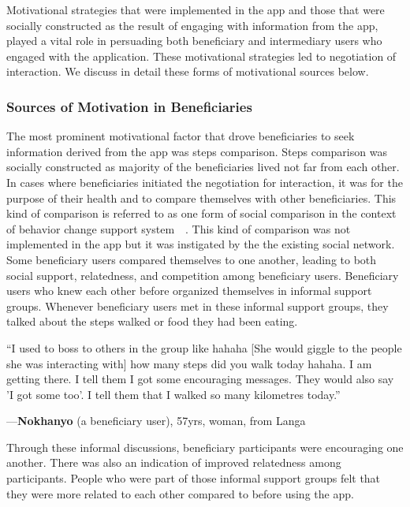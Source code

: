\documentclass{sig-alternate}
\newenvironment{myquote}
               {\list{}{\rightmargin   \leftmargin
                        \parsep        0in }%
                \item\relax}
               {\endlist}
\newcommand{\userquote}[2]{\begin{samepage}\begin{myquote} 
     \em{\small{#2\begin{flushright}---#1\end{flushright}}}
   \end{myquote}\end{samepage}}
\begin{document}
Motivational strategies that were implemented in the app and those that were
socially constructed as the result of engaging with information from the app,
played a vital role in persuading both beneficiary and intermediary users who
engaged with the application. These motivational strategies led to negotiation
of interaction. We discuss in detail these forms of motivational sources
below.

\subsubsection*{\textbf{Sources of Motivation in Beneficiaries}}

The most prominent motivational factor that drove beneficiaries to seek
information derived from the app was steps comparison. Steps comparison was
socially constructed as majority of the beneficiaries lived not far from each
other. In cases where beneficiaries initiated the negotiation for interaction,
it was for the purpose of their health and to compare themselves 
with other beneficiaries. This kind of comparison is referred to as one form of
social comparison in the context of behavior change support 
system~~\cite{Oinas-kukkonen:psd}. This kind of comparison 
was not implemented in the app but it was instigated by the the existing 
social network. Some beneficiary users compared themselves to one another,
leading to both social support, relatedness, and competition among beneficiary 
users. Beneficiary users who knew each other before organized themselves in 
informal support groups. Whenever beneficiary users met in these informal 
support groups, they talked about the steps walked or food they had been 
eating.

\userquote{\textbf{Nokhanyo} (a beneficiary user), 57yrs, woman, from Langa}
{``I used to boss to others in the group like hahaha [She would giggle
 to the people she was interacting with] how many steps did you walk today 
 hahaha. I am getting there. I tell them I got some encouraging messages. 
 They would also say 'I got some too'. I tell them that I walked so many 
 kilometres today.''}

Through these informal discussions, beneficiary participants were encouraging
one another. There was also an indication of improved relatedness among
participants. People who were part of those informal support groups felt that
they were more related to each other compared to before using the app.
\end{document}
